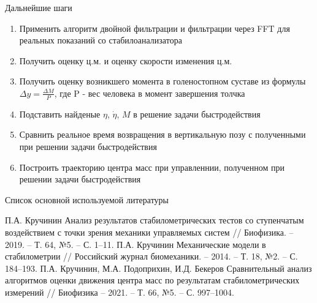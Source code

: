\documentclass[10pt]{beamer}
\begin{document}
\begin{frame}{Дальнейшие шаги}
	\begin{enumerate}
		\item Применить алгоритм двойной фильтрации и фильтрации через FFT для реальных показаний со стабилоанализатора
		\item Получить оценку ц.м. и оценку скорости изменения ц.м. 
		\item Получить оценку возникшего момента в голеностопном суставе из формулы $\Delta y=\frac{\Delta M}{P}$, где P - вес человека в момент завершения толчка
		\item Подставить найденые $\eta$, $\dot{\eta}$, $M$ в решение задачи быстродействия
		\item Сравнить реальное время возвращения в вертикальную позу с полученными при решении задачи быстродействия
		\item Построить траекторию центра масс при управленнии, полученном при решении задачи быстродействия
	  \end{enumerate}
	
\end{frame}
\begin{frame}{Список основной используемой литературы}

\begin{thebibliography}{15}
	П.А. Кручинин Анализ результатов стабилометрических тестов со ступенчатым воздействием с точки зрения механики управляемых систем
    // Биофизика. – 2019. – Т. 64, №5. – С. 1–11.
	П.А. Кручинин Механические модели в стабилометрии // Российский журнал биомеханики. – 2014. – Т. 18, №2. – С. 184–193.
	П.А. Кручинин, М.А. Подоприхин, И.Д. Бекеров Сравнительный анализ алгоритмов оценки движения центра масс по результатам стабилометрических измерений // Биофизика – 2021. – Т. 66, №5. – С. 997–1004. 
\end{thebibliography}
\end{frame}
\end{document}
